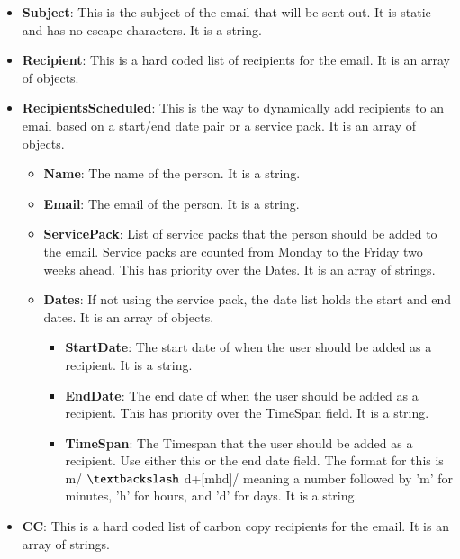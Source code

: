 \documentclass[a4paper,12pt]{report}
\begin{document}
\begin{itemize}
\begin{itemize}
\begin{itemize}
\item \textbf{Subject}: This is the subject of the email that will be sent out. It is static and has no escape characters. It is a string. \par
\item \textbf{Recipient}: This is a hard coded list of recipients for the email. It is an array of objects. \par
\item \textbf{RecipientsScheduled}: This is the way to dynamically add recipients to an email based on a start/end date pair or a service pack. It is an array of objects. \par
\begin{itemize}
\item \textbf{Name}: The name of the person. It is a string. \par
\item \textbf{Email}: The email of the person. It is a string. \par
\item \textbf{ServicePack}: List of service packs that the person should be added to the email. Service packs are counted from Monday to the Friday two weeks ahead. This has priority over the Dates. It is an array of strings. \par
\item \textbf{Dates}: If not using the service pack, the date list holds the start and end dates. It is an array of objects. \par
\begin{itemize}
\item \textbf{StartDate}: The start date of when the user should be added as a recipient. It is a string. \par
\item \textbf{EndDate}: The end date of when the user should be added as a recipient. This has priority over the TimeSpan field. It is a string. \par
\item \textbf{TimeSpan}: The Timespan that the user should be added as a recipient. Use either this or the end date field. The format for this is m/ $  \textbackslash  $ d+[mhd]/ meaning a number followed by 'm' for minutes, 'h' for hours, and 'd' for days. It is a string. \par
\end{itemize}
\end{itemize}
\item \textbf{CC}: This is a hard coded list of carbon copy recipients for the email. It is an array of strings. \par

\end{itemize}
\end{itemize}
\end{itemize}
\end{document}
